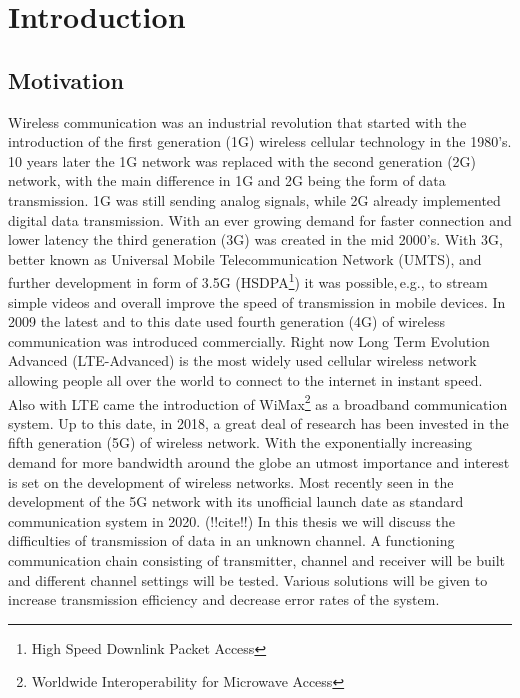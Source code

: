 \chapter{Introduction} \label{chap:intro}
\graphicspath{{C:/Users/Kevin/Bachelarbeit/Bachelorarbeit/01_Bachelorarbeit_LaTex/02_Figures/}}


\section{Motivation}

Wireless communication was an industrial revolution that started with the introduction of the first generation (1G) wireless cellular technology in the 1980's. 10 years later the 1G network was replaced with the second generation (2G) network, with the main difference in 1G and 2G being the form of data transmission. 1G was still sending analog signals, while 2G already implemented digital data transmission.
\newline
With an ever growing demand for faster connection and lower latency the third generation (3G) was created in the mid 2000's. With 3G, better known as Universal Mobile Telecommunication Network (UMTS), and further development in form of 3.5G (HSDPA\footnote{High Speed Downlink Packet Access}) it was possible,\,e.g., to stream simple videos and overall improve the speed of transmission in mobile devices. In 2009 the latest and to this date used fourth generation (4G) of wireless communication was introduced commercially. Right now Long Term Evolution Advanced (LTE-Advanced) is the most widely used cellular wireless network allowing people all over the world to connect to the internet in instant speed. Also with LTE came the introduction of WiMax\footnote{Worldwide Interoperability for Microwave Access} as a broadband communication system.
\newline
Up to this date, in 2018, a great deal of research has been invested in the fifth generation (5G) of wireless network. With the exponentially increasing demand for more bandwidth around the globe an utmost importance and interest is set on the development of wireless networks. 
Most recently seen in the development of the 5G network with its unofficial launch date as standard communication system in 2020.  (!!cite!!)
\newline
In this thesis we will discuss the difficulties of transmission of data in an unknown channel. A functioning communication chain consisting of transmitter, channel and receiver will be built and different channel settings will be tested. Various solutions will be given to increase transmission efficiency and decrease error rates of the system. 

